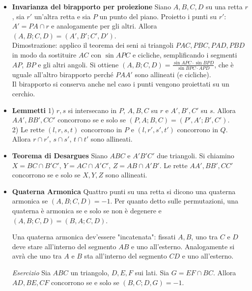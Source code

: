 \begin{itemize}
\item \textbf{Invarianza del birapporto per proiezione} Siano $A,B,C,D$ su una retta $r$, sia $r'$ un'altra retta e sia $P$ un punto del piano. Proietto i punti su $r'$: $A'=PA\cap r$ e analogamente per gli altri. Allora $(A,B;C,D)=(A',B';C',D')$.\\
Dimostrazione: applico il teorema dei seni ai triangoli $PAC,PBC,PAD,PBD$ in modo da sostituire $AC$ con $\sin APC$ e cicliche, semplificando i segmenti $AP$, $BP$ e gli altri angoli. Si ottiene $(A,B;C,D)=\frac{\sin APC \cdot \sin BPD}{\sin BPC \cdot APD}$, che è uguale all'altro birapporto perché $PAA'$ sono allineati (e cicliche).\\
Il birapporto si conserva anche nel caso i punti vengono proiettati su un cerchio.

\item \textbf{Lemmetti} 1) $r,s$ si intersecano in $P$, $A,B,C$ su $r$ e $A',B',C'$ su $s$. Allora $AA',BB',CC'$ concorrono se e solo se $(P,A;B,C)=(P',A';B',C')$.\\
2) Le rette $(l,r,s,t)$ concorrono in $P$ e $(l,r',s',t')$ concorrono in $Q$. Allora $r\cap r'$, $s \cap s'$, $t\cap t'$ sono allineati.

\item \textbf{Teorema di Desargues} Siano $ABC$ e $A'B'C'$ due triangoli. Si chiamino $X=BC\cap B'C'$, $Y=AC\cap A'C'$, $Z=AB\cap A'B'$. Le rette $AA',BB',CC'$ concorrono se e solo se $X,Y,Z$ sono allineati.




\item \textbf{Quaterna Armonica} Quattro punti su una retta si dicono una quaterna armonica se $(A,B;C,D)=-1$. Per quanto detto sulle permutazioni, una quaterna è armonica se e solo se non è degenere e $(A,B;C,D)=(B,A;C,D)$.

Una quaterna armonica dev'essere "incatenata": fissati $A,B$, uno tra $C$ e $D$ deve stare all'interno del segmento $AB$ e uno all'esterno. Analogamente si avrà che uno tra $A$ e $B$ sta all'interno del segmento $CD$ e uno all'esterno.

\emph{Esercizio} Sia $ABC$ un triangolo, $D,E,F$ sui lati. Sia $G=EF\cap BC$. Allora $AD,BE,CF$ concorrono se e solo se $(B,C;D,G)=-1$. 

\end{itemize}


\clearpage
